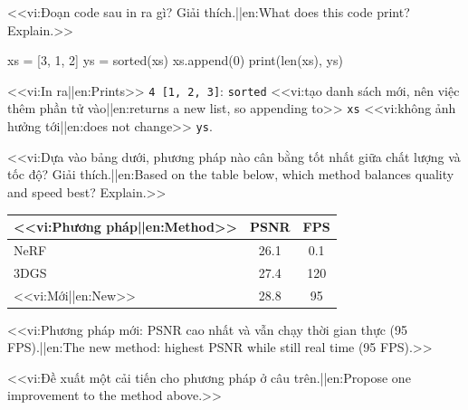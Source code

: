 \documentclass[11pt,a4paper,addpoints]{exam}
\begin{document}
\begin{questions}
\question[3]
<<vi:Đoạn code sau in ra gì? Giải thích.||en:What does this code print? Explain.>>
\begin{lkcode}[Python]{}
xs = [3, 1, 2]
ys = sorted(xs)
xs.append(0)
print(len(xs), ys)
\end{lkcode}
\begin{solution}
<<vi:In ra||en:Prints>> \texttt{4 [1, 2, 3]}: \texttt{sorted} <<vi:tạo danh sách mới, nên việc thêm phần tử vào||en:returns a new list, so appending to>> \texttt{xs} <<vi:không ảnh hưởng tới||en:does not change>> \texttt{ys}.
\end{solution}
\fillwithlines{2cm}

\question[2]
<<vi:Dựa vào bảng dưới, phương pháp nào cân bằng tốt nhất giữa chất lượng và tốc độ? Giải thích.||en:Based on the table below, which method balances quality and speed best? Explain.>>
\begin{center}
  \begin{tabular}{l cc}\toprule
    <<vi:Phương pháp||en:Method>> & PSNR\up & FPS\up \\ \midrule
    NeRF & 26.1 & 0.1 \\
    3DGS & 27.4 & 120 \\
    <<vi:Mới||en:New>> & 28.8 & 95 \\ \bottomrule
  \end{tabular}
\end{center}
\begin{solution}
<<vi:Phương pháp mới: PSNR cao nhất và vẫn chạy thời gian thực (95 FPS).||en:The new method: highest PSNR while still real time (95 FPS).>>
\end{solution}
\fillwithlines{2cm}

\bonusquestion[1]
<<vi:Đề xuất một cải tiến cho phương pháp ở câu trên.||en:Propose one improvement to the method above.>>
\fillwithlines{2cm}

\end{questions}
\end{document}
